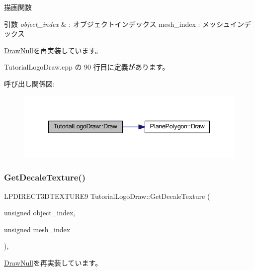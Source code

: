 描画関数 


\begin{DoxyParams}{引数}
{\em object\+\_\+index} & \+: オブジェクトインデックス mesh\+\_\+index \+: メッシュインデックス \\
\hline
\end{DoxyParams}


\mbox{\hyperlink{class_draw_null_afe50f6fd820b18d673f70f048743f339}{Draw\+Null}}を再実装しています。



 Tutorial\+Logo\+Draw.\+cpp の 90 行目に定義があります。

呼び出し関係図\+:\nopagebreak
\begin{figure}[H]
\begin{center}
\leavevmode
\includegraphics[width=339pt]{class_tutorial_logo_draw_aa808cfb8bc59d58bbd698a195603429f_cgraph}
\end{center}
\end{figure}
\mbox{\label{class_tutorial_logo_draw_ad9df98aa8a5b11872dba6f6609589035}} 
\subsubsection{\texorpdfstring{Get\+Decale\+Texture()}{GetDecaleTexture()}}
{\footnotesize\ttfamily L\+P\+D\+I\+R\+E\+C\+T3\+D\+T\+E\+X\+T\+U\+R\+E9 Tutorial\+Logo\+Draw\+::\+Get\+Decale\+Texture (\begin{DoxyParamCaption}\item[{unsigned}]{object\+\_\+index,  }\item[{unsigned}]{mesh\+\_\+index }\end{DoxyParamCaption})\hspace{0.3cm}{\ttfamily [override]}, {\ttfamily [virtual]}}



\mbox{\hyperlink{class_draw_null_a8496ed1b1f765a331a8f1704122b8ca4}{Draw\+Null}}を再実装しています。



